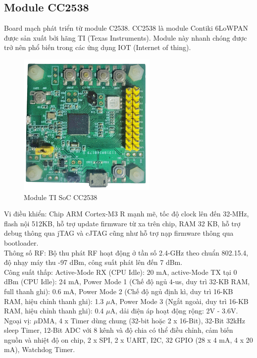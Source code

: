 \documentclass{report}
\begin{document}
\subsection{Module CC2538}
Board mạch phát triển từ module C2538. CC2538 là module Contiki 6LoWPAN được sản
xuất bởi hãng TI (Texas Instruments). Module này nhanh chóng được trở nên phổ biến trong
các ứng dụng IOT (Internet of thing).
\begin{figure}[h]
	\centering
	\includegraphics[scale = 0.7]{fig34.png}
	\caption{Module TI SoC CC2538}
	\label{fig:Graph34}
\end{figure}

Vi điều khiển: Chip ARM Cortex-M3 R mạnh mẽ, tốc độ clock lên đến 32-MHz, flash nội
512KB, hỗ trợ update firmware từ xa trên chip, RAM 32 KB, hỗ trợ debug thông qua jTAG
và cJTAG cũng như hỗ trợ nạp firmware thông qua bootloader. \\


Thông số RF: Bộ thu phát RF hoạt động ở tần số 2.4-GHz theo chuẩn 802.15.4, độ nhạy
máy thu -97 dBm, công suất phát lên đến 7 dBm. \\

Công suất thấp: Active-Mode RX (CPU Idle): 20 mA, active-Mode TX tại 0 dBm (CPU Idle):
24 mA, Power Mode 1 (Chế độ ngủ 4-us, duy trì 32-KB RAM, full thanh ghi): 0.6 mA, Power
Mode 2 (Chế độ ngủ định kì, duy trì 16-KB RAM, hiệu chỉnh thanh ghi): 1.3 $\mu$A, Power Mode
3 (Ngắt ngoài, duy trì 16-KB RAM, hiệu chỉnh thanh ghi): 0.4 $\mu$A, dải điện áp hoạt động rộng:
2V - 3.6V. \\

Ngoại vị: $\mu$DMA, 4 x Timer dùng chung (32-bit hoặc 2 x 16-Bit), 32-Bit 32kHz sleep Timer,
12-Bit ADC với 8 kênh và độ chia có thể điều chỉnh, cảm biến nguồn và nhiệt độ on chip, 2 x SPI, 2 x UART, I2C, 32 GPIO (28 x 4 mA, 4 x 20 mA), Watchdog Timer. \\
\end{document}
